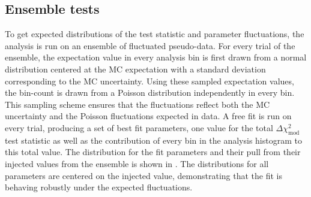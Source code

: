 \subsection{Ensemble tests}
\label{sec:three-flavor-ensemble}
To get expected distributions of the test statistic and parameter fluctuations, the analysis is run on an ensemble of fluctuated pseudo-data. For every trial of the ensemble, the expectation value in every analysis bin is first drawn from a normal distribution centered at the MC expectation with a standard deviation corresponding to the MC uncertainty. Using these sampled expectation values, the bin-count is drawn from a Poisson distribution independently in every bin. This sampling scheme ensures that the fluctuations reflect both the MC uncertainty and the Poisson fluctuations expected in data. A free fit is run on every trial, producing a set of best fit parameters, one value for the total $\Delta \chi^2_{\mathrm{mod}}$ test statistic as well as the contribution of every bin in the analysis histogram to this total value. The distribution for the fit parameters and their pull from their injected values from the ensemble is shown in . The distributions for all parameters are centered on the injected value, demonstrating that the fit is behaving robustly under the expected fluctuations. 

